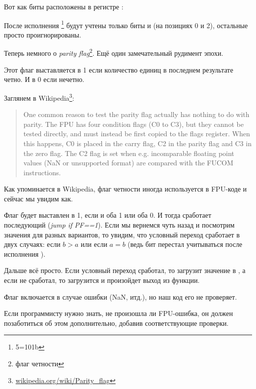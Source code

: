 

Вот как биты \CThreeBits расположены в регистре \AH:



После исполнения \footnote{5=101b} %
будут учтены только биты \Czero и \Ctwo (на позициях 0 и 2), остальные просто проигнорированы.

\label{parity_flag}
Теперь немного о \emph{parity flag}\footnote{флаг четности}. 
Ещё один замечательный рудимент эпохи.

Этот флаг выставляется в 1 если количество единиц в последнем результате четно. 
И в 0 если нечетно.

Заглянем в Wikipedia\footnote{\href{http://go.yurichev.com/17131}{wikipedia.org/wiki/Parity\_flag}}:

\begin{framed}
\begin{quotation}
One common reason to test the parity flag actually has nothing to do with parity. The FPU has four condition flags 
(C0 to C3), but they cannot be tested directly, and must instead be first copied to the flags register. 
When this happens, C0 is placed in the carry flag, C2 in the parity flag and C3 in the zero flag. 
The C2 flag is set when e.g. incomparable floating point values (NaN or unsupported format) are compared 
with the FUCOM instructions.
\end{quotation}
\end{framed}

Как упоминается в Wikipedia, флаг четности иногда используется в FPU-коде и сейчас мы увидим как.

Флаг \PF будет выставлен в 1, если \Czero и \Ctwo оба 1 или оба 0. 
И тогда сработает последующий \JP (\emph{jump if PF==1}). 
Если мы вернемся чуть назад и посмотрим значения \CThreeBits 
для разных вариантов, то увидим, что условный переход \JP сработает в двух случаях: если $b>a$ или если $a=b$ 
(ведь бит \Cthree перестал учитываться после исполнения ).

Дальше всё просто. Если условный переход сработал, то \FLD загрузит значение  в , 
а если не сработал, то загрузится  и произойдет выход из функции.


Флаг \Ctwo включается в случае ошибки (\gls{NaN}, итд.), но наш код его не проверяет.

Если программисту нужно знать, не произошла ли FPU-ошибка, он должен позаботиться об этом
дополнительно, добавив соответствующие проверки.


